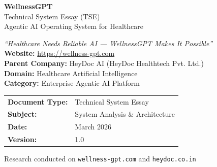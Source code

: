 \documentclass[12pt,a4paper]{article}
\begin{document}
\begin{titlepage}
    \centering
    \vspace*{2cm}

    {\Huge\bfseries\color{primaryblue} WellnessGPT}\\[0.5cm]
    {\Large\color{accentpurple} Technical System Essay (TSE)}\\[0.3cm]
    {\large\color{darkgray} Agentic AI Operating System for Healthcare}\\[2cm]

    \begin{mdframed}[backgroundcolor=lightgray, linecolor=primaryblue, linewidth=1.5pt, roundcorner=5pt]
        \centering
        \vspace{0.3cm}
        \textit{``Healthcare Needs Reliable AI --- WellnessGPT Makes It Possible''}\\[0.3cm]
        \textbf{Website:} \href{https://wellness-gpt.com}{https://wellness-gpt.com}\\
        \textbf{Parent Company:} HeyDoc AI (HeyDoc Healthtech Pvt. Ltd.)\\
        \textbf{Domain:} Healthcare Artificial Intelligence\\
        \textbf{Category:} Enterprise Agentic AI Platform\\
        \vspace{0.3cm}
    \end{mdframed}

    \vspace{2cm}

    \begin{tabular}{ll}
        \textbf{Document Type:} & Technical System Essay \\
        \textbf{Subject:}       & System Analysis \& Architecture \\
        \textbf{Date:}          & March 2026 \\
        \textbf{Version:}       & 1.0 \\
    \end{tabular}

    \vfill

    {\small\color{darkgray} Research conducted on \texttt{wellness-gpt.com} and \texttt{heydoc.co.in}}
\end{titlepage}

\tableofcontents
\newpage
\end{document}
